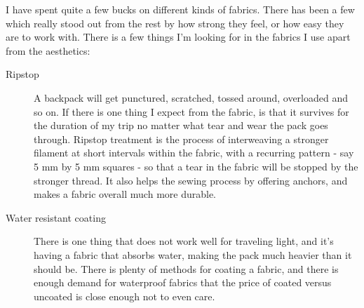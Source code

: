 I have spent quite a few bucks on different kinds of fabrics. There has been a few which really stood out from the rest by how strong they feel, or how easy they are to work with. There is a few things I'm looking for in the fabrics I use apart from the aesthetics:

\begin{description}

  \item [Ripstop] A backpack will get punctured, scratched, tossed around, overloaded and so on. If there is one thing I expect from the fabric, is that it survives for the duration of my trip no matter what tear and wear the pack goes through. Ripstop treatment is the process of interweaving a stronger filament at short intervals within the fabric, with a recurring pattern - say 5 mm by 5 mm squares - so that a tear in the fabric will be stopped by the stronger thread. It also helps the sewing process by offering anchors, and makes a fabric overall much more durable.

  \item [Water resistant coating] There is one thing that does not work well for traveling light, and it's having a fabric that absorbs water, making the pack much heavier than it should be. There is plenty of methods for coating a fabric, and there is enough demand for waterproof fabrics that the price of coated versus uncoated is close enough not to even care.

\end{description}

